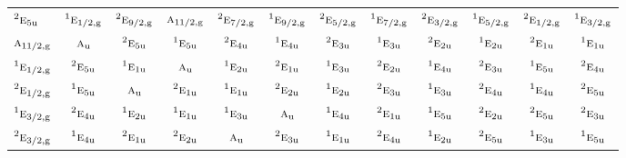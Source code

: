 \documentclass[10pt,a4paper]{article}
\numberwithin{equation}{section}
\newcommand{\irr}[1]{\text{\normalfont\scshape #1}}
\newcommand{\conjpair}[1]{{}^{#1}}
\newcommand{\ptag}[1]{\mathrm{#1}}
\begin{document}
{\begin{longtable}{@{}lccccccccccc@{}}
$\conjpair{2}\irr{e}_{5\ptag{u}}$ & $\conjpair{1}\irr{e}_{1/2,\ptag{g}}$ & $\conjpair{2}\irr{e}_{9/2,\ptag{g}}$ & $\irr{a}_{11/2,\ptag{g}}$ & $\conjpair{2}\irr{e}_{7/2,\ptag{g}}$ & $\conjpair{1}\irr{e}_{9/2,\ptag{g}}$ & $\conjpair{2}\irr{e}_{5/2,\ptag{g}}$ & $\conjpair{1}\irr{e}_{7/2,\ptag{g}}$ & $\conjpair{2}\irr{e}_{3/2,\ptag{g}}$ & $\conjpair{1}\irr{e}_{5/2,\ptag{g}}$ & $\conjpair{2}\irr{e}_{1/2,\ptag{g}}$ & $\conjpair{1}\irr{e}_{3/2,\ptag{g}}$\\
$\irr{a}_{11/2,\ptag{g}}$ & $\irr{a}_{\ptag{u}}$ & $\conjpair{2}\irr{e}_{5\ptag{u}}$ & $\conjpair{1}\irr{e}_{5\ptag{u}}$ & $\conjpair{2}\irr{e}_{4\ptag{u}}$ & $\conjpair{1}\irr{e}_{4\ptag{u}}$ & $\conjpair{2}\irr{e}_{3\ptag{u}}$ & $\conjpair{1}\irr{e}_{3\ptag{u}}$ & $\conjpair{2}\irr{e}_{2\ptag{u}}$ & $\conjpair{1}\irr{e}_{2\ptag{u}}$ & $\conjpair{2}\irr{e}_{1\ptag{u}}$ & $\conjpair{1}\irr{e}_{1\ptag{u}}$\\
$\conjpair{1}\irr{e}_{1/2,\ptag{g}}$ & $\conjpair{2}\irr{e}_{5\ptag{u}}$ & $\conjpair{1}\irr{e}_{1\ptag{u}}$ & $\irr{a}_{\ptag{u}}$ & $\conjpair{1}\irr{e}_{2\ptag{u}}$ & $\conjpair{2}\irr{e}_{1\ptag{u}}$ & $\conjpair{1}\irr{e}_{3\ptag{u}}$ & $\conjpair{2}\irr{e}_{2\ptag{u}}$ & $\conjpair{1}\irr{e}_{4\ptag{u}}$ & $\conjpair{2}\irr{e}_{3\ptag{u}}$ & $\conjpair{1}\irr{e}_{5\ptag{u}}$ & $\conjpair{2}\irr{e}_{4\ptag{u}}$\\
$\conjpair{2}\irr{e}_{1/2,\ptag{g}}$ & $\conjpair{1}\irr{e}_{5\ptag{u}}$ & $\irr{a}_{\ptag{u}}$ & $\conjpair{2}\irr{e}_{1\ptag{u}}$ & $\conjpair{1}\irr{e}_{1\ptag{u}}$ & $\conjpair{2}\irr{e}_{2\ptag{u}}$ & $\conjpair{1}\irr{e}_{2\ptag{u}}$ & $\conjpair{2}\irr{e}_{3\ptag{u}}$ & $\conjpair{1}\irr{e}_{3\ptag{u}}$ & $\conjpair{2}\irr{e}_{4\ptag{u}}$ & $\conjpair{1}\irr{e}_{4\ptag{u}}$ & $\conjpair{2}\irr{e}_{5\ptag{u}}$\\
$\conjpair{1}\irr{e}_{3/2,\ptag{g}}$ & $\conjpair{2}\irr{e}_{4\ptag{u}}$ & $\conjpair{1}\irr{e}_{2\ptag{u}}$ & $\conjpair{1}\irr{e}_{1\ptag{u}}$ & $\conjpair{1}\irr{e}_{3\ptag{u}}$ & $\irr{a}_{\ptag{u}}$ & $\conjpair{1}\irr{e}_{4\ptag{u}}$ & $\conjpair{2}\irr{e}_{1\ptag{u}}$ & $\conjpair{1}\irr{e}_{5\ptag{u}}$ & $\conjpair{2}\irr{e}_{2\ptag{u}}$ & $\conjpair{2}\irr{e}_{5\ptag{u}}$ & $\conjpair{2}\irr{e}_{3\ptag{u}}$\\
$\conjpair{2}\irr{e}_{3/2,\ptag{g}}$ & $\conjpair{1}\irr{e}_{4\ptag{u}}$ & $\conjpair{2}\irr{e}_{1\ptag{u}}$ & $\conjpair{2}\irr{e}_{2\ptag{u}}$ & $\irr{a}_{\ptag{u}}$ & $\conjpair{2}\irr{e}_{3\ptag{u}}$ & $\conjpair{1}\irr{e}_{1\ptag{u}}$ & $\conjpair{2}\irr{e}_{4\ptag{u}}$ & $\conjpair{1}\irr{e}_{2\ptag{u}}$ & $\conjpair{2}\irr{e}_{5\ptag{u}}$ & $\conjpair{1}\irr{e}_{3\ptag{u}}$ & $\conjpair{1}\irr{e}_{5\ptag{u}}$\\

\end{longtable}}
\end{document}
